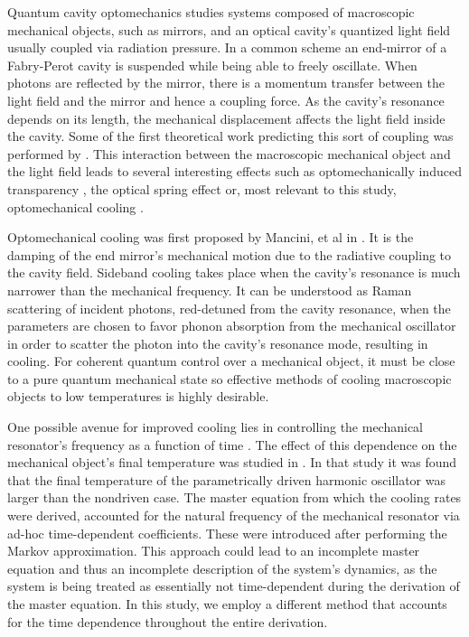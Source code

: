 \documentclass[reprint, amsmath,amssymb, aps,pra]{revtex4-1}
\begin{document}
Quantum cavity optomechanics studies systems composed of macroscopic
mechanical objects, such as mirrors, and an optical cavity's quantized light field
usually coupled via radiation pressure.
In a common scheme an end-mirror of a Fabry-Perot
cavity is suspended while being able to freely oscillate.
When photons are reflected by the mirror, there is a
momentum transfer between the light field and the mirror and hence a coupling force. As the cavity's
resonance depends on its length, the mechanical
displacement affects the light field inside the cavity. Some of the first theoretical work predicting this sort of coupling was performed by \cite{BraginskiiOG}. This interaction between
the macroscopic mechanical object and the light field leads to several
interesting effects such as optomechanically induced
transparency \cite{WeissOIT}, the optical spring effect \cite{VogelOT}
or, most relevant to this study, optomechanical
cooling \cite{CohadonCM, CorbittOC, SchliesserRPC, LCNooshi}.
	
Optomechanical cooling was first proposed by Mancini, et al in
\cite{ManciniOC}. It is the damping of the end mirror's mechanical
motion due to the radiative coupling to the cavity field. Sideband cooling takes place when the cavity's resonance is much narrower than the mechanical frequency. It can be understood as Raman scattering
\cite{MarquardtQTOQ} of incident photons, red-detuned from the
cavity resonance, when the parameters are chosen to favor phonon absorption from the mechanical oscillator in order to scatter the photon
into the cavity's resonance mode, resulting in cooling. For coherent quantum control over a mechanical object, it must be
close to a pure quantum mechanical state \cite{KippenberCO} so
effective methods of cooling macroscopic objects to low temperatures is highly desirable.

One possible avenue for improved cooling lies in controlling the
mechanical resonator's frequency as a function of time
\cite{JockelMR}. The effect of this dependence on the mechanical
object's final temperature was studied in \cite{BarberisLC}. In that
study it was found that the final temperature of the parametrically
driven harmonic oscillator was larger than the nondriven case.
The master equation from which the cooling rates were derived,
accounted for the natural frequency of the mechanical
resonator via ad-hoc time-dependent coefficients. These were
introduced after performing the Markov approximation. This approach
could lead to an incomplete master equation and thus an incomplete
description of the system's dynamics, as the system is being treated
as essentially not time-dependent during the derivation of the master
equation. In this study, we employ a different method that accounts
for the time dependence throughout the entire derivation.
\end{document}
